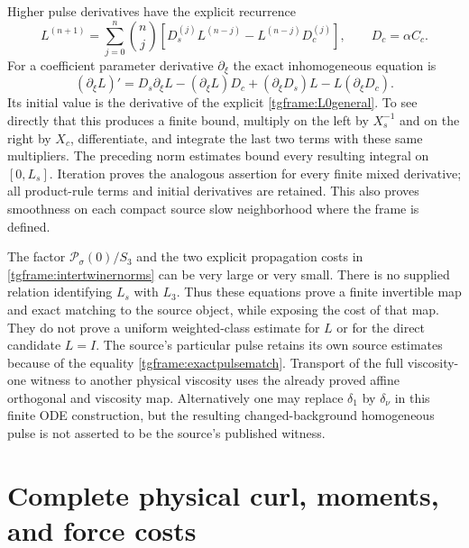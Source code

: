 \documentclass[11pt]{article}
\begin{document}
Higher pulse derivatives have the explicit recurrence
\[
 L^{(n+1)}=
 \sum_{j=0}^n\binom nj\left[
 D_s^{(j)}L^{(n-j)}-L^{(n-j)}D_c^{(j)}\right],
 \qquad D_c=\alpha C_c .
\]
For a coefficient parameter derivative $\partial_\xi$ the exact
inhomogeneous equation is
\[
 (\partial_\xi L)'=D_s\partial_\xi L
       -(\partial_\xi L)D_c
       +(\partial_\xi D_s)L-L(\partial_\xi D_c).
\]
Its initial value is the derivative of the explicit
\eqref{tgframe:L0general}. To see directly that this produces a finite
bound, multiply on the left by $X_s^{-1}$ and on the right by $X_c$,
differentiate, and integrate the last two terms with these same
multipliers. The preceding norm estimates bound every resulting
integral on $[0,L_s]$. Iteration proves the analogous assertion for
every finite mixed derivative; all product-rule terms and initial
derivatives are retained. This also proves smoothness on each compact
source slow neighborhood where the frame is defined.

The factor $\mathcal P_\sigma(0)/S_3$ and the two explicit propagation
costs in \eqref{tgframe:intertwinernorms} can be very large or very small.
There is no supplied relation identifying $L_s$ with $L_3$.
Thus these equations prove a finite invertible map and exact matching
to the source object, while exposing the cost of that map. They do not
prove a uniform weighted-class estimate for $L$ or for the direct
candidate $L=I$. The source's particular pulse retains its own source
estimates because of the equality \eqref{tgframe:exactpulsematch}.
Transport of the full viscosity-one witness to another physical
viscosity uses the already proved affine orthogonal and viscosity map.
Alternatively one may replace $\delta_1$ by $\delta_\nu$ in this
finite ODE construction, but the resulting changed-background
homogeneous pulse is not asserted to be the source's published witness.

\clearpage\part{Complete physical curl, moments, and force costs}
\end{document}
